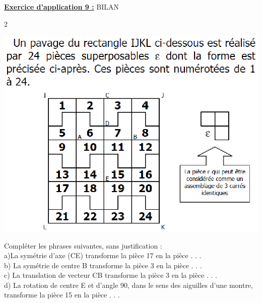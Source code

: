 \documentclass[a4paper,11pt]{article}
\newcommand{\bmul}[1]{\begin{multicols}{#1}}
\newcommand{\emul}{\end{multicols}}
\begin{document}
\textbf{\underline{Exercice d'application 9 :}} BILAN\\
\bmul{2}
\begin{flushleft}
\includegraphics[scale=0.75]{rotation4.eps} 
\end{flushleft}

\columnbreak

Compléter les phrases suivantes, sans justification :\\

a)La symétrie d'axe (CE) transforme la pièce 17 en
la pièce . . .\\

b) La symétrie de centre B transforme la pièce 3 en
la pièce . . .\\

c) La translation de vecteur CB transforme la pièce
3 en la pièce . . .\\

d) La rotation de centre E et d'angle 90\degre, dans le
sens des aiguilles d'une montre, transforme la pièce
15 en la pièce . . .\\

\emul
\end{document}
